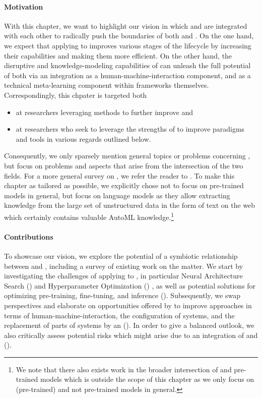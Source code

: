 \paragraph{Motivation} With this chapter, we want to highlight our vision in which \AutoML and \LLMs are integrated with each other to radically push the boundaries of both \AutoML and \NLP. On the one hand, we expect that applying \AutoML to \LLMs improves various stages of the \LLM lifecycle by increasing their capabilities and making them more efficient. On the other hand, the disruptive \NLP and knowledge-modeling capabilities of \LLMs can unleash the full potential of \AutoML both via an integration as a human-machine-interaction component, and as a technical meta-learning component within \AutoML frameworks themselves. Correspondingly, this chpater is targeted both 
\begin{itemize}
    \item at \NLP researchers leveraging \AutoML methods to further improve \LLMs and
    \item at \AutoML researchers who seek to leverage the strengths of \LLMs to improve \AutoML paradigms and tools in various regards outlined below.
\end{itemize}
Consequently, we only sparsely mention general topics or problems concerning \LLMs, but focus on problems and aspects that arise from the intersection of the two fields.
For a more general survey on \LLMs, we refer the reader to \cite{zhao-arxiv23a}.
To make this chapter as tailored as possible, we explicitly chose not to focus on pre-trained models in general, but focus on language models as they allow extracting knowledge from the large set of unstructured data in the form of text on the web which certainly contains valuable AutoML knowledge.\footnote{We note that there also exists work in the broader intersection of \AutoML and pre-trained models \cite{hollmann-iclr23a,muller-icml23a} which is outside the scope of this chapter as we only focus on (pre-trained) \LLMs and not pre-trained models in general.}

\paragraph{Contributions} To showcase our vision, we explore the potential of a symbiotic relationship between \AutoML and \LLMs, including a survey of existing work on the matter. We start by investigating the challenges of applying \AutoML to \LLMs, in particular Neural Architecture Search (\NAS) \cite{elsken-jmlr19a,wistuba-arxiv19a,white-arxiv23a} and Hyperparameter Optimization (\HPO) \cite{feurer-automlbook19a,bischl-dmkd23a}, as well as potential solutions for optimizing pre-training, fine-tuning, and inference (). Subsequently, we swap perspectives and elaborate on opportunities offered by \LLMs to improve \AutoML approaches in terms of human-machine-interaction, the configuration of \AutoML systems, and the replacement of parts of \AutoML systems by an \LLM (). In order to give a balanced outlook, we also critically assess potential risks which might arise due to an integration of \AutoML and \LLMs (). 

